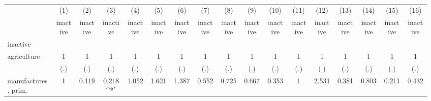 {
\def\sym#1{\ifmmode^{#1}\else\(^{#1}\)\fi}
\begin{tabular}{l*{16}{c}}
\hline\hline
                    &\multicolumn{1}{c}{(1)}&\multicolumn{1}{c}{(2)}&\multicolumn{1}{c}{(3)}&\multicolumn{1}{c}{(4)}&\multicolumn{1}{c}{(5)}&\multicolumn{1}{c}{(6)}&\multicolumn{1}{c}{(7)}&\multicolumn{1}{c}{(8)}&\multicolumn{1}{c}{(9)}&\multicolumn{1}{c}{(10)}&\multicolumn{1}{c}{(11)}&\multicolumn{1}{c}{(12)}&\multicolumn{1}{c}{(13)}&\multicolumn{1}{c}{(14)}&\multicolumn{1}{c}{(15)}&\multicolumn{1}{c}{(16)}\\
                    &\multicolumn{1}{c}{inactive}&\multicolumn{1}{c}{inactive}&\multicolumn{1}{c}{inactive}&\multicolumn{1}{c}{inactive}&\multicolumn{1}{c}{inactive}&\multicolumn{1}{c}{inactive}&\multicolumn{1}{c}{inactive}&\multicolumn{1}{c}{inactive}&\multicolumn{1}{c}{inactive}&\multicolumn{1}{c}{inactive}&\multicolumn{1}{c}{inactive}&\multicolumn{1}{c}{inactive}&\multicolumn{1}{c}{inactive}&\multicolumn{1}{c}{inactive}&\multicolumn{1}{c}{inactive}&\multicolumn{1}{c}{inactive}\\
\hline
inactive            &                     &                     &                     &                     &                     &                     &                     &                     &                     &                     &                     &                     &                     &                     &                     &                     \\
agriculture         &           1         &           1         &           1         &           1         &           1         &           1         &           1         &           1         &           1         &           1         &           1         &           1         &           1         &           1         &           1         &           1         \\
                    &         (.)         &         (.)         &         (.)         &         (.)         &         (.)         &         (.)         &         (.)         &         (.)         &         (.)         &         (.)         &         (.)         &         (.)         &         (.)         &         (.)         &         (.)         &         (.)         \\
[1em]
manufactures, prim. &           1         &       0.119         &       0.218\sym{*}  &       1.052         &       1.621         &       1.387         &       0.552         &       0.725         &       0.667         &       0.353         &           1         &       2.531         &       0.381         &       0.803         &       0.211         &       0.432         \\

\end{tabular}}
